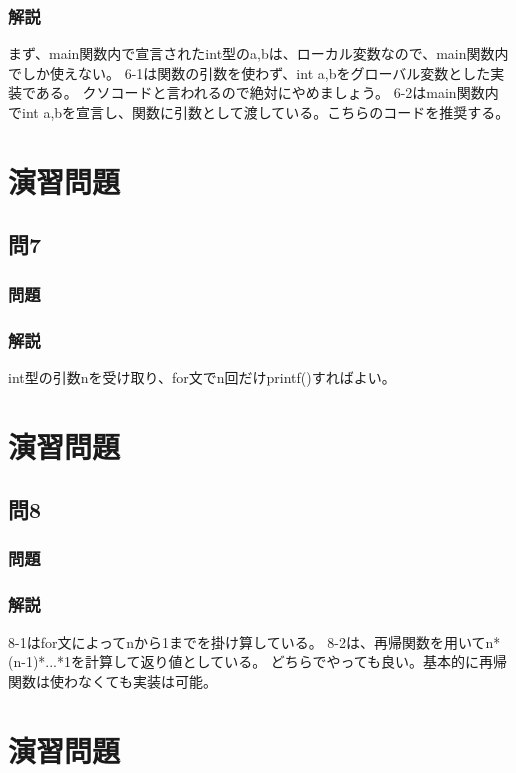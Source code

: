 \subsubsection{解説}

まず、main関数内で宣言されたint型のa,bは、ローカル変数なので、main関数内でしか使えない。
6-1は関数の引数を使わず、int a,bをグローバル変数とした実装である。
クソコードと言われるので絶対にやめましょう。
6-2はmain関数内でint a,bを宣言し、関数に引数として渡している。こちらのコードを推奨する。

\section{演習問題}
\subsection{問7}
\subsubsection{問題}

\subsubsection{解説}

int型の引数nを受け取り、for文でn回だけprintf()すればよい。

\section{演習問題}
\subsection{問8}
\subsubsection{問題}

\subsubsection{解説}

8-1はfor文によってnから1までを掛け算している。
8-2は、再帰関数を用いてn*(n-1)*...*1を計算して返り値としている。
どちらでやっても良い。基本的に再帰関数は使わなくても実装は可能。

\section{演習問題}
